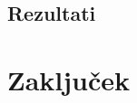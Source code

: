 \documentclass{acm_proc_article-sp}
\begin{document}
\subsection{Rezultati}


\section{Zaključek}


%

%
%

\balancecolumns
\end{document}
